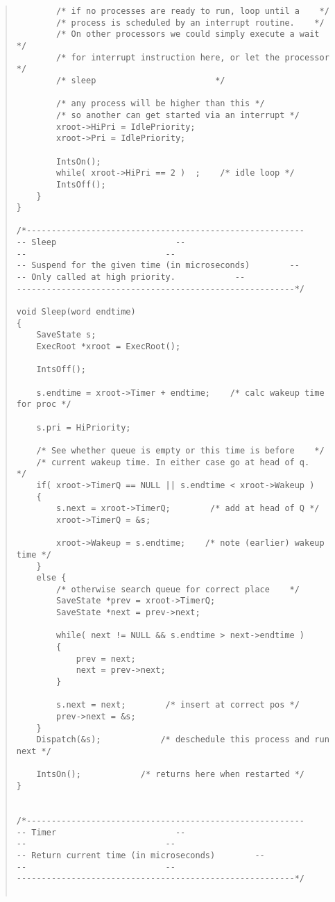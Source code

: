 \begin {quote}
\begin{verbatim}
        /* if no processes are ready to run, loop until a    */
        /* process is scheduled by an interrupt routine.    */
        /* On other processors we could simply execute a wait    */
        /* for interrupt instruction here, or let the processor */
        /* sleep                        */

        /* any process will be higher than this */
        /* so another can get started via an interrupt */
        xroot->HiPri = IdlePriority;
        xroot->Pri = IdlePriority;

        IntsOn();
        while( xroot->HiPri == 2 )  ;    /* idle loop */
        IntsOff();
    }
}

/*--------------------------------------------------------
-- Sleep                        --
--                            --
-- Suspend for the given time (in microseconds)        --
-- Only called at high priority.            --
--------------------------------------------------------*/

void Sleep(word endtime)
{
    SaveState s;
    ExecRoot *xroot = ExecRoot();

    IntsOff();

    s.endtime = xroot->Timer + endtime;    /* calc wakeup time for proc */

    s.pri = HiPriority;

    /* See whether queue is empty or this time is before    */
    /* current wakeup time. In either case go at head of q.    */
    if( xroot->TimerQ == NULL || s.endtime < xroot->Wakeup )
    {
        s.next = xroot->TimerQ;        /* add at head of Q */
        xroot->TimerQ = &s;

        xroot->Wakeup = s.endtime;    /* note (earlier) wakeup time */
    }
    else {
        /* otherwise search queue for correct place    */
        SaveState *prev = xroot->TimerQ;
        SaveState *next = prev->next;

        while( next != NULL && s.endtime > next->endtime )
        {
            prev = next;
            next = prev->next;
        }

        s.next = next;        /* insert at correct pos */
        prev->next = &s;
    }
    Dispatch(&s);            /* deschedule this process and run next */

    IntsOn();            /* returns here when restarted */
}


/*--------------------------------------------------------
-- Timer                        --
--                            --
-- Return current time (in microseconds)        --
--                            --
--------------------------------------------------------*/


\end{verbatim}
\end{quote}

